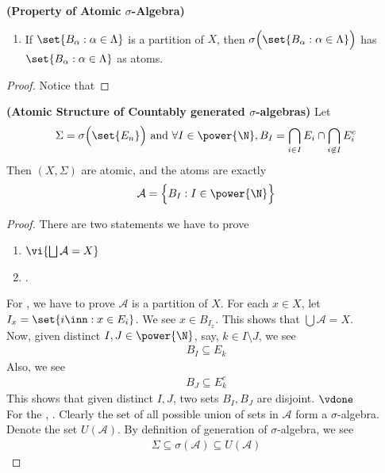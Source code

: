 \documentclass{report}
\begin{document}
\begin{theorem}
\label{0.7.17}
\textbf{(Property of Atomic $\sigma$-Algebra)} 
\begin{enumerate}[label=(\alph*)]
  \item If $\set{B_\alpha :\alpha \in \Lambda }$ is a partition of $X$, then  $\sigma \Big(\set{B_\alpha :\alpha \in \Lambda } \Big)$ has $\set{B_\alpha :\alpha \in \Lambda }$ as atoms.
\end{enumerate}
\end{theorem}
\begin{proof}
Notice that 
\end{proof}
\begin{theorem}
\label{0.7.18}
\textbf{(Atomic Structure of Countably generated $\sigma$-algebras)} Let  
\begin{align*} \Sigma=\sigma\Big(\set{E_n}\Big)\text{ and }\forall I \in \power{\N}, B_I=\bigcap_{i \in I}E_i \cap \bigcap_{i\not\in I}E_i^c
\end{align*}
Then $(X,\Sigma)$ are atomic, and the atoms are exactly 
\begin{align*}
\mathcal{A}=\Big\{B_I :I \in \power{\N}\Big\}
\end{align*}
\end{theorem}
\begin{proof}
There are two statements we have to prove 
\begin{enumerate}[label=(\alph*)]
  \item $\vi{\bigsqcup \mathcal{A}=X}$
  \item {}. 
\end{enumerate}
For , we have to prove $\mathcal{A}$ is a partition of  $X$. For each $x\in X$, let $I_x=\set{i\inn: x \in E_i}$. We see $x\in B_{I_x}$. This shows that $\bigcup \mathcal{A}=X$.\\

Now, given distinct $I,J \in \power{\N}$, say,  $k\in I \setminus J$, we see 
\begin{align*}
B_I \subseteq E_k
\end{align*}
Also, we see 
\begin{align*}
B_J\subseteq E_k^c
\end{align*}
This shows that given distinct $I,J$, two sets  $B_I,B_J$ are disjoint. $\vdone$\\

For the , . Clearly the set of all possible union of sets in $\mathcal{A}$ form a $\sigma$-algebra. Denote the set $U(\mathcal{A})$. By definition of generation of $\sigma$-algebra, we see 
\begin{align*}
\Sigma\subseteq \sigma(\mathcal{A})\subseteq U(\mathcal{A})
\end{align*}


\end{proof}
\end{document}

